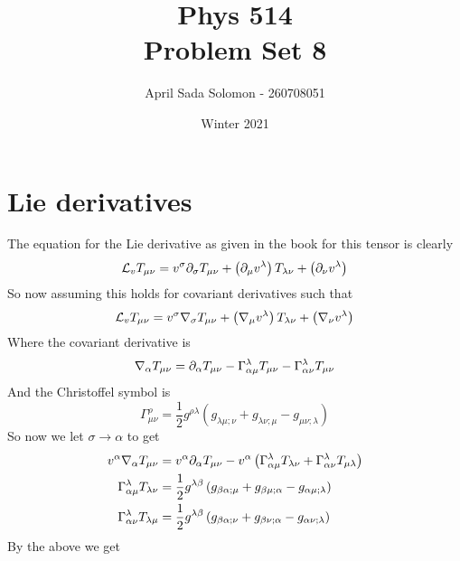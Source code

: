 \documentclass{article}
\title{Phys 514 \\
	\large Problem Set 8}
\author{April Sada Solomon - 260708051}
\date{Winter 2021}
\begin{document}
	\maketitle
	\thispagestyle{empty}
	\pagebreak
	
	\cfoot{\thepage}
	
	\tableofcontents
	\newpage
	
	
	\setcounter{page}{1}
	\cfoot{\thepage}
	
	\section{Lie derivatives}
	The equation for the Lie derivative as given in the book for this tensor is clearly
	$$ \mathcal{L}_v T_{\mu\nu} = v^\sigma \partial_\sigma T_{\mu\nu} + \left( \partial_\mu v^\lambda \right) T_{\lambda\nu} +\left( \partial_\nu v^\lambda \right)$$
	So now assuming this holds for covariant derivatives such that
	$$ \mathcal{L}_v T_{\mu\nu} = v^\sigma \nabla_\sigma T_{\mu\nu} + \left( \nabla_\mu v^\lambda \right) T_{\lambda\nu} +\left( \nabla_\nu v^\lambda \right)$$ 
	Where the covariant derivative is 
	$$ \nabla_\alpha T_{\mu\nu} = \partial_\alpha T_{\mu\nu} - \Gamma_{\alpha\mu}^\lambda T_{\mu\nu} - \Gamma_{\alpha\nu}^\lambda T_{\mu\nu}$$
	And the Christoffel symbol is
	$$\Gamma_{\mu\nu}^\rho = \frac12 g^{\rho\lambda} \left( g_{\lambda\mu;\nu} + g_{\lambda\nu;\mu} - g_{\mu\nu;\lambda} \right)$$
	So now we let $\sigma \to \alpha$ to get
	\begin{align*}
		v^\alpha \nabla_\alpha T_{\mu\nu} &= v^\alpha \partial_\alpha T_{\mu\nu} - v^\alpha \left( \Gamma_{\alpha \mu}^\lambda T_{\lambda\nu} + \Gamma_{\alpha\nu}^\lambda T_{\mu\lambda} \right) \\
		\Gamma_{\alpha \mu}^\lambda T_{\lambda \nu} &= \frac12 g^{\lambda\beta} \left( g_{\beta\alpha;\mu} + g_{\beta\mu; \alpha} - g_{\alpha\mu;\lambda}\right) \\
		\Gamma_{\alpha \nu}^\lambda T_{\lambda \mu} &= \frac12 g^{\lambda\beta} \left( g_{\beta\alpha;\nu} + g_{\beta\nu; \alpha} - g_{\alpha\nu;\lambda}\right)
	\end{align*}
	By the above we get
\end{document}
